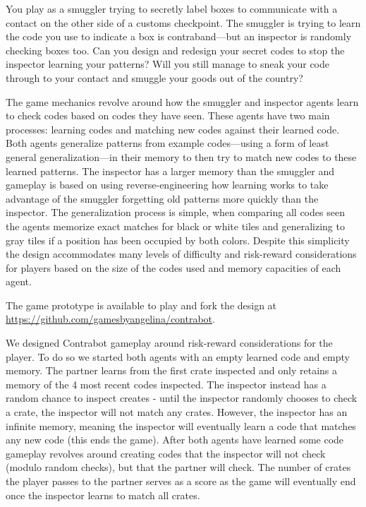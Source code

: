 \documentclass{sig-alternate}
\begin{document}
You play as a smuggler trying to secretly label boxes to communicate with a contact on the other side of a customs checkpoint.
The smuggler is trying to learn the code you use to indicate a box is contraband---but an inspector is randomly checking boxes too.
Can you design and redesign your secret codes to stop the inspector learning your patterns?
Will you still manage to sneak your code through to your contact and smuggle your goods out of the country?

The game mechanics revolve around how the smuggler and inspector agents learn to check codes based on codes they have seen.
These agents have two main processes: learning codes and matching new codes against their learned code.
Both agents generalize patterns from example codes---using a form of least general generalization---in their memory to then try to match new codes to these learned patterns.
The inspector has a larger memory than the smuggler and gameplay is based on using reverse-engineering how learning works to take advantage of the smuggler forgetting old patterns more quickly than the inspector.
%
The generalization process is simple, when comparing all codes seen the agents memorize exact matches for black or white tiles and generalizing to gray tiles if a position has been occupied by both colors.
Despite this simplicity the design accommodates many levels of difficulty and risk-reward considerations for players based on the size of the codes used and memory capacities of each agent.

The game prototype is available to play and fork the design at \url{https://github.com/gamesbyangelina/contrabot}.

We designed Contrabot gameplay around risk-reward
considerations for the player. To do so we started both agents with
an empty learned code and empty memory. The partner learns
from the first crate inspected and only retains a memory of the 4
most recent codes inspected. The inspector instead has a random
chance to inspect creates - until the inspector randomly chooses to
check a crate, the inspector will not match any crates. However,
the inspector has an infinite memory, meaning the inspector will
eventually learn a code that matches any new code (this ends the
game). After both agents have learned some code gameplay
revolves around creating codes that the inspector will not check
(modulo random checks), but that the partner will check. The
number of crates the player passes to the partner serves as a score
as the game will eventually end once the inspector learns to match
all crates.
\end{document}
